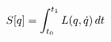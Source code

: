 \documentclass[preview]{standalone}
\begin{document}
\begin{align*}
\special{dvisvgm:raw <g id='unique000'>}S[q] = \int_{t_0}^{t_1} L(q,\dot q)\, dt\special{dvisvgm:raw </g>}
\end{align*}
\end{document}
